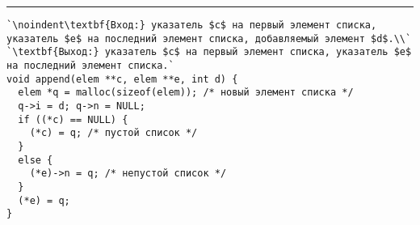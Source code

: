 \documentclass{article}
\begin{document}
\vspace{5pt} \hrule
\begin{lstlisting}[caption={Процедура Append — присоединение элемента в конец списка}, label=p44_append, escapechar=`]
`\noindent\textbf{Вход:} указатель $c$ на первый элемент списка, указатель $e$ на последний элемент списка, добавляемый элемент $d$.\\`
`\textbf{Выход:} указатель $c$ на первый элемент списка, указатель $e$ на последний элемент списка.`
void append(elem **c, elem **e, int d) {
  elem *q = malloc(sizeof(elem)); /* новый элемент списка */
  q->i = d; q->n = NULL;
  if ((*c) == NULL) {
    (*c) = q; /* пустой список */
  }
  else {
    (*e)->n = q; /* непустой список */
  }
  (*e) = q;
}
\end{lstlisting}
\end{document}
